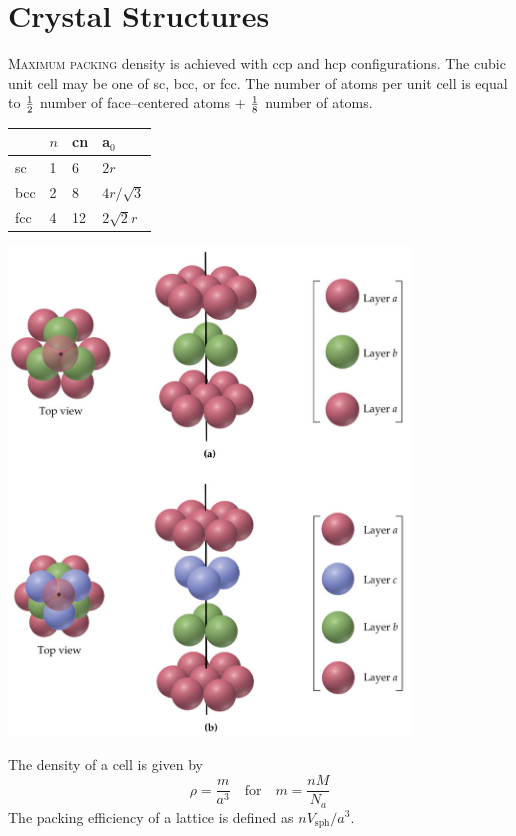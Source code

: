 \documentclass{tufte-book}
\begin{document}
\section{Crystal Structures}
\textsc{Maximum packing} density is achieved with ccp and hcp configurations. The cubic unit cell may be one of sc, bcc, or fcc. The number of atoms per unit cell is equal to $1 \over 2$ number of face--centered atoms + $1 \over 8$ number of atoms.
\begin{center}
  \begin{tabular}{llll}
    & $n$ & cn & a$_0$ \\
    \hline
    sc & 1 & 6 & $2r$ \\
    bcc & 2 & 8 & $4r / \sqrt 3$ \\
    fcc & 4 & 12 & $2 \sqrt 2r$
  \end{tabular}
\end{center}
%
\begin{marginfigure}[-10mm]
\begin{center}
  \includegraphics[width=0.8\textwidth]{matsci}
\end{center}
\end{marginfigure}
%
The density of a cell is given by \begin{equation}
  \rho = \frac{m}{a^3} \quad\text{for}\quad m = \frac{nM}{N_a}
\end{equation}
The packing efficiency of a lattice is defined as $n V_{\text{sph}} / a^3$.
\end{document}

